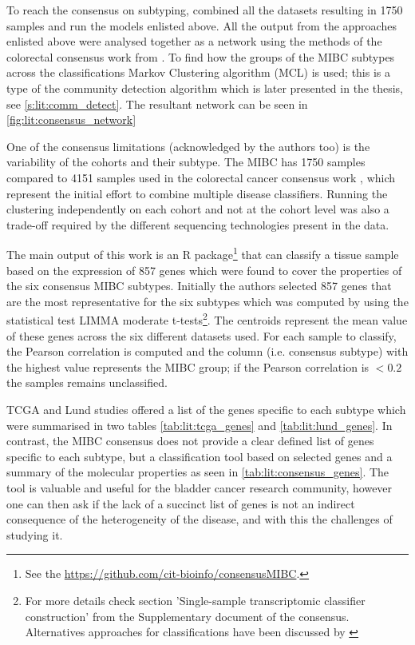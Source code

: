 To reach the consensus on subtyping, \citet{Kamoun2020-tj} combined all the datasets resulting in 1750 samples and run the models enlisted above. All the output from the approaches enlisted above were analysed together as a network using the methods of the colorectal consensus work from \citet{Guinney2015-fy}. To find how the groups of the MIBC subtypes across the classifications Markov Clustering algorithm (MCL) \citet{Van_Dongen2008-yj} is used; this is a type of the community detection algorithm which is later presented in the thesis, see \cref{s:lit:comm_detect}. The resultant network can be seen in \cref{fig:lit:consensus_network}


One of the consensus limitations (acknowledged by the authors too) is the variability of the cohorts and their subtype. The MIBC has 1750 samples compared to 4151 samples used in the colorectal cancer consensus work \cite{Guinney2015-fy}, which represent the initial effort to combine multiple disease classifiers. Running the clustering independently on each cohort and not at the cohort level was also a trade-off required by the different sequencing technologies present in the data. 

The main output of this work is an R package\footnote{See the \url{https://github.com/cit-bioinfo/consensusMIBC}.} that can classify a tissue sample based on the expression of 857 genes which were found to cover the properties of the six consensus MIBC subtypes. Initially the authors selected 857 genes that are the most representative for the six subtypes which was computed by using the statistical test LIMMA moderate t-tests\footnote{For more details check section 'Single-sample transcriptomic classifier construction' from the Supplementary document of the consensus. Alternatives approaches for classifications have been discussed by \citet{Eriksson2022-vw}}. The centroids represent the mean value of these genes across the six different datasets used. For each sample to classify, the Pearson correlation is computed and the column (i.e. consensus subtype) with the highest value represents the MIBC group; if the Pearson correlation is $<0.2$ the samples remains unclassified. 


TCGA and Lund studies offered a list of the genes specific to each subtype which were summarised in two tables \cref{tab:lit:tcga_genes} and \cref{tab:lit:lund_genes}. In contrast, the MIBC consensus does not provide a clear defined list of genes specific to each subtype, but a classification tool based on selected genes and a summary of the molecular properties as seen in \cref{tab:lit:consensus_genes}. The tool is valuable and useful for the bladder cancer research community, however one can then ask if the lack of a succinct list of genes is not an indirect consequence of the heterogeneity of the disease, and with this the challenges of studying it. 

